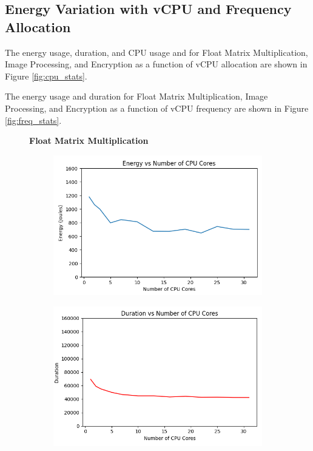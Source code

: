 \documentclass[times, 10pt,twocolumn]{article}
\begin{document}
\subsection{Energy Variation with vCPU and Frequency Allocation}
\label{appendix:energy_variation_vcpu_frequency}
The energy usage, duration, and CPU usage and for Float Matrix Multiplication, Image Processing, and Encryption as a function of vCPU allocation are shown in Figure \ref{fig:cpu_stats}. 

The energy usage and duration for Float Matrix Multiplication, Image Processing, and Encryption as a function of vCPU frequency are shown in Figure \ref{fig:freq_stats}. 
\begin{figure}[ht]
   \centering
   \textbf{Float Matrix Multiplication}\par\medskip
   \begin{subfigure}[b]{0.3\textwidth}
     \includegraphics[width=\textwidth]{imgs/study_1_results/var_cpu/floatmatmul/CPU_Energy.png}
     \caption{}
     \label{fig:plot1}
   \end{subfigure}
   \hfill
   \begin{subfigure}[b]{0.3\textwidth}
      \includegraphics[width=\textwidth]{imgs/study_1_results/var_cpu/floatmatmul/CPU_Duration.png}

\end{subfigure}
\end{figure}
\end{document}
